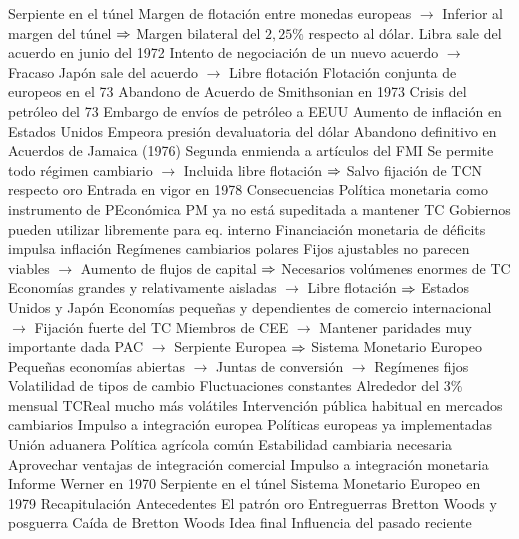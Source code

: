 \documentclass{nuevotema}
\begin{document}
\begin{esquemal}
				\4 Serpiente en el túnel
				\4[] Margen de flotación entre monedas europeas
				\4[] $\to$ Inferior al margen del túnel
				\4[] $\then$ Margen bilateral del $2,25\%$ respecto al dólar.
				\4 Libra sale del acuerdo en junio del 1972
				\4 Intento de negociación de un nuevo acuerdo
				\4[] $\to$ Fracaso
				\4 Japón sale del acuerdo
				\4[] $\to$ Libre flotación
				\4 Flotación conjunta de europeos en el 73
				\4[$\then$] Abandono de Acuerdo de Smithsonian en 1973
			\3 Crisis del petróleo del 73
				\4 Embargo de envíos de petróleo a EEUU
				\4 Aumento de inflación en Estados Unidos
				\4 Empeora presión devaluatoria del dólar
			\3 Abandono definitivo en Acuerdos de Jamaica (1976)
				\4 Segunda enmienda a artículos del FMI
				\4 Se permite todo régimen cambiario
				\4[] $\to$ Incluida libre flotación
				\4[] $\then$ Salvo fijación de TCN respecto oro
				\4[] Entrada en vigor en 1978
		\2 Consecuencias
			\3 Política monetaria como instrumento de PEconómica
				\4 PM ya no está supeditada a mantener TC
				\4 Gobiernos pueden utilizar libremente para eq. interno
				\4 Financiación monetaria de déficits impulsa inflación
			\3 Regímenes cambiarios polares
				\4 Fijos ajustables no parecen viables
				\4[] $\to$ Aumento de flujos de capital
				\4[] $\then$ Necesarios volúmenes enormes de TC
				\4 Economías grandes y relativamente aisladas
				\4[] $\to$ Libre flotación
				\4[] $\then$ Estados Unidos y Japón
				\4 Economías pequeñas y dependientes de comercio internacional
				\4[] $\to$ Fijación fuerte del TC
				\4[] Miembros de CEE
				\4[] $\to$ Mantener paridades muy importante dada PAC
				\4[] $\to$ Serpiente Europea
				\4[] $\then$ Sistema Monetario Europeo
				\4[] Pequeñas economías abiertas
				\4[] $\to$ Juntas de conversión
				\4[] $\to$ Regímenes fijos
			\3 Volatilidad de tipos de cambio
				\4 Fluctuaciones constantes
				\4 Alrededor del $3\%$ mensual
				\4 TCReal mucho más volátiles
				\4 Intervención pública habitual en mercados cambiarios
			\3 Impulso a integración europea
				\4 Políticas europeas ya implementadas
				\4[] Unión aduanera
				\4[] Política agrícola común
				\4 Estabilidad cambiaria necesaria
				\4[] Aprovechar ventajas de integración comercial
				\4[$\then$] Impulso a integración monetaria
				\4[] Informe Werner en 1970
				\4[] Serpiente en el túnel
				\4[] Sistema Monetario Europeo en 1979
	\1[] 
		\2 Recapitulación
			\3 Antecedentes
			\3 El patrón oro
			\3 Entreguerras
			\3 Bretton Woods y posguerra
			\3 Caída de Bretton Woods
		\2 Idea final
			\3 Influencia del pasado reciente

\end{esquemal}
\end{document}
